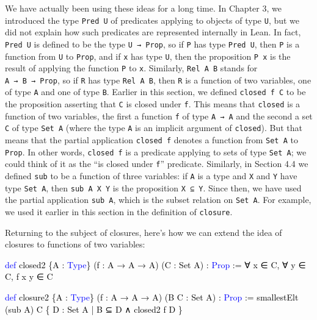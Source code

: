 \documentclass[
  letterpaper,
  DIV=11,
  numbers=noendperiod]{scrreprt}
\newenvironment{Shaded}{\begin{snugshade}}{\end{snugshade}}
\newcommand{\KeywordTok}[1]{\textcolor[rgb]{0.00,0.23,0.31}{#1}}
\newcommand{\NormalTok}[1]{\textcolor[rgb]{0.00,0.23,0.31}{#1}}
\renewcommand{\NormalTok}[1]{\textcolor[HTML]{000000}{#1}}
\renewcommand{\KeywordTok}[1]{\textcolor[HTML]{0000FF}{#1}}
\theoremstyle{remark}
\begin{document}
We have actually been using these ideas for a long time. In Chapter 3,
we introduced the type \texttt{Pred\ U} of predicates applying to
objects of type \texttt{U}, but we did not explain how such predicates
are represented internally in Lean. In fact, \texttt{Pred\ U} is defined
to be the type \texttt{U\ →\ Prop}, so if \texttt{P} has type
\texttt{Pred\ U}, then \texttt{P} is a function from \texttt{U} to
\texttt{Prop}, and if \texttt{x} has type \texttt{U}, then the
proposition \texttt{P\ x} is the result of applying the function
\texttt{P} to \texttt{x}. Similarly, \texttt{Rel\ A\ B} stands for
\texttt{A\ →\ B\ →\ Prop}, so if \texttt{R} has type \texttt{Rel\ A\ B},
then \texttt{R} is a function of two variables, one of type \texttt{A}
and one of type \texttt{B}. Earlier in this section, we defined
\texttt{closed\ f\ C} to be the proposition asserting that \texttt{C} is
closed under \texttt{f}. This means that \texttt{closed} is a function
of two variables, the first a function \texttt{f} of type
\texttt{A\ →\ A} and the second a set \texttt{C} of type \texttt{Set\ A}
(where the type \texttt{A} is an implicit argument of \texttt{closed}).
But that means that the partial application \texttt{closed\ f} denotes a
function from \texttt{Set\ A} to \texttt{Prop}. In other words,
\texttt{closed\ f} is a predicate applying to sets of type
\texttt{Set\ A}; we could think of it as the ``is closed under
\texttt{f}'' predicate. Similarly, in Section 4.4 we defined
\texttt{sub} to be a function of three variables: if \texttt{A} is a
type and \texttt{X} and \texttt{Y} have type \texttt{Set\ A}, then
\texttt{sub\ A\ X\ Y} is the proposition \texttt{X\ ⊆\ Y}. Since then,
we have used the partial application \texttt{sub\ A}, which is the
subset relation on \texttt{Set\ A}. For example, we used it earlier in
this section in the definition of \texttt{closure}.

Returning to the subject of closures, here's how we can extend the idea
of closures to functions of two variables:

\begin{Shaded}
\begin{Highlighting}[]
\KeywordTok{def}\NormalTok{ closed2 \{A : }\KeywordTok{Type}\NormalTok{\} (f : A → A → A) (C : Set A) : }\KeywordTok{Prop}\NormalTok{ :=}
\NormalTok{  ∀ x ∈ C, ∀ y ∈ C, f x y ∈ C}

\KeywordTok{def}\NormalTok{ closure2 \{A : }\KeywordTok{Type}\NormalTok{\} (f : A → A → A) (B C : Set A) : }\KeywordTok{Prop}\NormalTok{ := }
\NormalTok{  smallestElt (sub A) C \{ D : Set A | B ⊆ D ∧ closed2 f D \}}
\end{Highlighting}
\end{Shaded}
\end{document}
